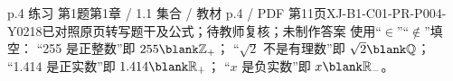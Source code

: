 \par\noindent\begin{minipage}{\linewidth}
\begin{bankitem}{p.4 练习 第1题}{第1章 / 1.1 集合 / 教材 p.4 / PDF 第11页}{XJ-B1-C01-PR-P004-Y0218}{已对照原页转写题干及公式；待教师复核；未制作答案}
使用“$\in$”“$\notin$”填空：
“255 是正整数”即 $255\blank\mathbb Z_+$；
“$\sqrt2$ 不是有理数”即 $\sqrt2\blank\mathbb Q$；
“1.414 是正实数”即 $1.414\blank\mathbb R_+$；
“$x$ 是负实数”即 $x\blank\mathbb R_-$。
\end{bankitem}
\end{minipage}\par\medskip
